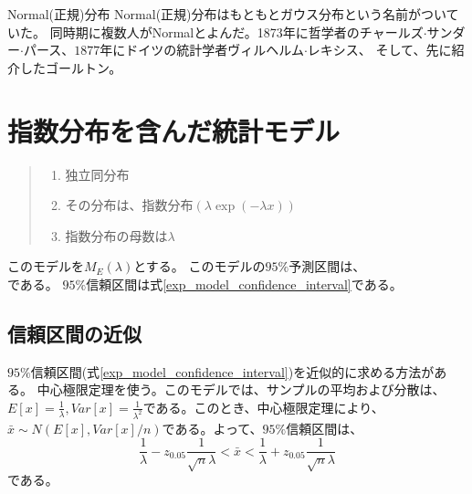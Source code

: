 \begin{SMbox}{Normal(正規)分布}
 Normal(正規)分布はもともとガウス分布という名前がついていた。
 同時期に複数人がNormalとよんだ。1873年に哲学者のチャールズ$\cdot$サンダー$\cdot$パース、$1877$年にドイツの統計学者ヴィルヘルム$\cdot$レキシス、
 そして、先に紹介したゴールトン。

\end{SMbox}


\section{指数分布を含んだ統計モデル}
\begin{quote}
    \begin{enumerate}[(1)]
    \item 独立同分布
    \item その分布は、指数分布$(\lambda\exp{(-\lambda x)})$
    \item 指数分布の母数は$\lambda$
    \end{enumerate}
\end{quote}
このモデルを$M_E(\lambda)$とする。
このモデルの$95\%$予測区間は、
\begin{equation*}
    [\frac{1}{\lambda} \log\frac{1}{1-\alpha/2} ,\frac{1}{\lambda}\log\frac{\alpha}{2} ]
\end{equation*}
である。
$95\%$信頼区間は式\ref{exp_model_confidence_interval}である。


\subsection{信頼区間の近似}
$95\%$信頼区間(式\ref{exp_model_confidence_interval})を近似的に求める方法がある。
中心極限定理を使う。このモデルでは、サンプルの平均および分散は、$E[x]=\frac{1}{\lambda},Var[x]=\frac{1}{\lambda^2}$である。このとき、中心極限定理により、$\bar{x}\sim N(E[x],Var[x]/n)$である。よって、$95\%$信頼区間は、
\begin{equation*}
\frac{1}{\lambda}-z_{0.05}\frac{1}{\sqrt{n}\lambda}<\bar{x}<\frac{1}{\lambda}+z_{0.05}\frac{1}{\sqrt{n}\lambda}
\end{equation*}
である。

